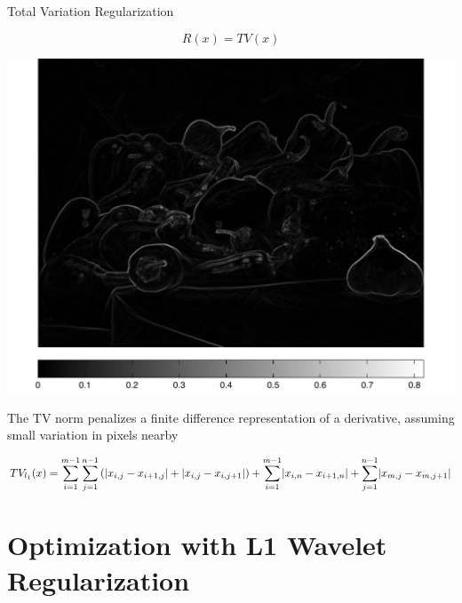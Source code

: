 \documentclass[12pt]{beamer}
\DeclarePairedDelimiter{\abs}{\lvert}{\rvert}
\begin{document}
\begin{frame}{Total Variation Regularization}

\vspace{-4ex}
\[ R(x) = TV(x) \]

\vspace{2ex}
\begin{minipage}[T]{0.45\textwidth}
	\begin{center}
	\includegraphics[width=1\textwidth]{../figures/diff.pdf} \\
	
	\end{center}
\end{minipage}
\begin{minipage}[T]{0.5\textwidth}
The TV norm penalizes a finite difference representation of a derivative, assuming small variation in pixels nearby \\[4ex]
\end{minipage}
\tiny $$ TV_{l_1}(x) = \sum_{i=1}^{m-1} \sum_{j=1}^{n-1} \left( \abs{x_{i,j}  - x_{i+1,j} } + \abs{ x_{i,j} - x_{i,j+1}  } \right) + \sum_{i=1}^{m-1} \abs{ x_{i,n} - x_{i+1,n} } + \sum_{j=1}^{n-1} \abs{ x_{m,j} - x_{m,j+1 } }$$
\end{frame}

\section{Optimization with L1 Wavelet Regularization}
\end{document}

